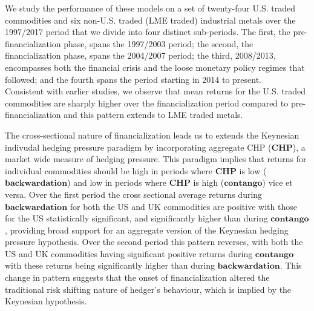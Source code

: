 \documentclass[11pt, letterpaper, doublespacing]{article}
\renewcommand{\footnote}{\endnote}
\let\rmarkdownfootnote\footnote%
\def\footnote{\protect\rmarkdownfootnote}
\begin{document}
We study the performance of these models on a set of twenty-four U.S.
traded commodities and six non-U.S. traded (LME traded) industrial
metals over the 1997/2017 period that we divide into four distinct
sub-periods. The first, the pre-financialization phase, spans the
1997/2003 period; the second, the financialization phase, spans the
2004/2007 period\footnote{Starting point based on earlier studies
  \citep{baker_financialization_2014, christoffersen_factor_2014}.}; the
third, 2008/2013, encompasses both the financial crisis and the loose
monetary policy regimes that followed; and the fourth spans the period
starting in 2014 to present.\\
Consistent with earlier studies, we observe that mean returns for the
U.S. traded commodities are sharply higher over the financialization
period compared to pre-financialization and this pattern extends to LME
traded metals.

The cross-sectional nature of financialization
\citep{basak_model_2016, cheng_financialization_2014} leads us to
extends the Keynesian indivudal hedging pressure paradigm by
incorporating aggregate CHP (\(\mathbf{CHP}\)), a market wide measure of
hedging pressure. This paradigm implies that returns for individual
commodities should be high in periods where \(\mathbf{CHP}\) is low
(\(\mathbf{backwardation}\)) and low in periods where \(\mathbf{CHP}\)
is high (\(\mathbf{contango}\)) vice et versa. Over the first period the
cross sectional average returns during \(\mathbf{backwardation}\) for
both the US and UK commodities are positive with those for the US
statistically significant, and significantly higher than during
\(\mathbf{contango}\), providing broad support for an aggregate version
of the Keynesian hedging pressure hypothesis. Over the second period
this pattern reverses, with both the US and UK commodities having
significant positive returns during \(\mathbf{contango}\) with these
returns being significantly higher than during
\(\mathbf{backwardation}\). This change in pattern suggests that the
onset of financialization altered the traditional risk shifting nature
of hedger's behaviour, which is implied by the Keynesian hypothesis.
\end{document}
